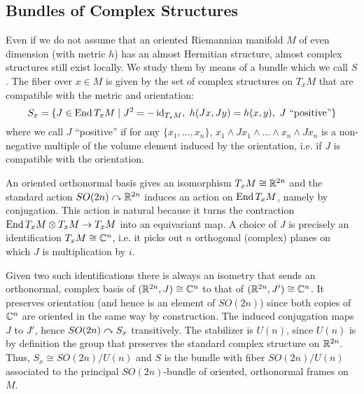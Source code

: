 \documentclass{scrartcl}
\begin{document}
\subsection{Bundles of Complex Structures}

Even if we do not assume that an oriented Riemannian manifold $M$ of even dimension (with metric $h$) has an almost Hermitian structure, almost complex structures still exist locally. We study them by means of a bundle which we call $S$. The fiber over $x\in M$ is given by the set of complex structures on $T_xM$ that are compatible with the metric and orientation:
\begin{equation*}
S_x=\{J\in \End T_xM\mid J^2=-\id_{T_xM},\ h(Jx,Jy)=h(x,y),\ J\text{ ``positive''}\}
\end{equation*} 
where we call $J$ ``positive'' if for any $\{x_1,\dots,x_n\}$, $x_1\wedge Jx_1\wedge\dots\wedge x_n\wedge J x_n$ is a non-negative multiple of the volume element induced by the orientation, i.e. if $J$ is compatible with the orientation.

\medskip

An oriented orthonormal basis gives an isomorphism $T_xM\cong \mathbb{R}^{2n}$ and the standard action $SO(2n)\curvearrowright \mathbb{R}^{2n}$ induces an action on $\operatorname{End} T_xM$, namely by conjugation. This action is natural because it turns the contraction $\operatorname{End} T_xM\otimes T_xM\to T_xM$ into an equivariant map. A choice of $J$ is precisely an identification $T_xM\cong \mathbb{C}^n$, i.e. it picks out $n$ orthogonal (complex) planes on which $J$ is multiplication by $i$. 

\medskip

Given two such identifications there is always an isometry that sends an orthonormal, complex basis of $(\mathbb{R}^{2n},J)\cong \mathbb{C}^n$ to that of $(\mathbb{R}^{2n},J')\cong \mathbb{C}^n$. It preserves orientation (and hence is an element of $SO(2n)$) since both copies of $\mathbb{C}^n$ are oriented in the same way by construction. The induced conjugation maps $J$ to $J'$, hence $SO(2n)\curvearrowright S_x$ transitively. The stabilizer is $U(n)$, since $U(n)$ is by definition the group that preserves the standard complex structure on $\mathbb{R}^{2n}$. Thus, $S_x\cong SO(2n)/U(n)$ and $S$ is the bundle with fiber $SO(2n)/U(n)$ associated to the principal $SO(2n)$-bundle of oriented, orthonormal frames on $M$.

\medskip
\end{document}
